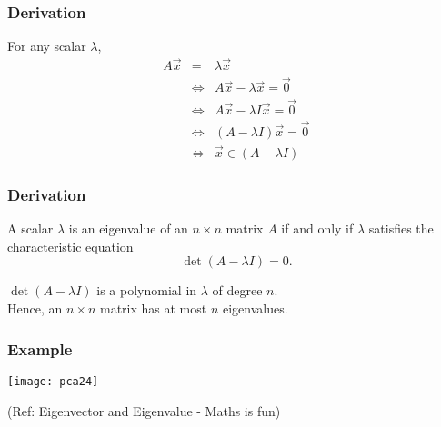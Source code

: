 \begin{frame}[fragile]\frametitle{Derivation}


\begin{definition}
For any scalar $\lambda$,
\begin{eqnarray*}
 A \vec{x} &=& \lambda \vec{x}   \\
 &\Leftrightarrow&  
A \vec{x} -\lambda \vec{x} = \vec{0}  \\
 &\Leftrightarrow&  
 A \vec{x} -\lambda I \vec{x} = \vec{0}  \\
  &\Leftrightarrow& 
  \left( A - \lambda I \right) \vec{x} =\vec{0} \\
   &\Leftrightarrow&  
\vec{x} \in (A -\lambda I)
\end{eqnarray*}
\end{definition}
\end{frame}



\begin{frame}[fragile]\frametitle{Derivation}
\begin{theorem}
 A scalar $\lambda$ is an eigenvalue of an $n\times n$ matrix $A$ if and only if 
$\lambda$ satisfies the \underline{characteristic equation} 
\[
 \det(A -\lambda I) = 0.
\]
\end{theorem}


\begin{theorem}
$\det(A-\lambda I)$ is a polynomial in $\lambda$ of degree $n$.   \\ 
Hence, an $n\times n$ matrix has at most $n$ eigenvalues. 
\end{theorem}
\end{frame}

\begin{frame}[fragile]\frametitle{Example}

\begin{center}
\texttt{[image: pca24]}
\end{center}

{\tiny (Ref: Eigenvector and Eigenvalue - Maths is fun)}
\end{frame}


